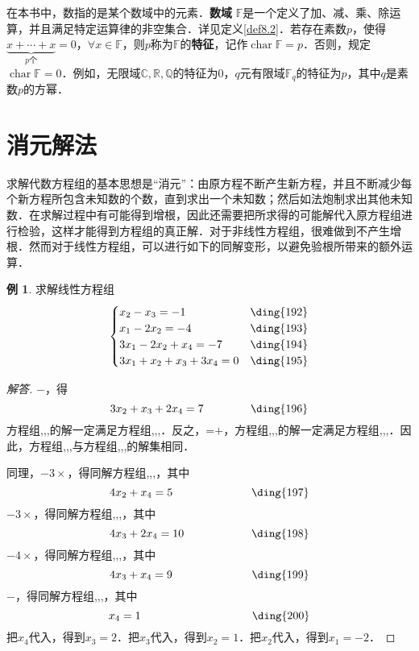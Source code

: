\documentclass[a4paper,fontset=windows]{ctexbook}
\theoremstyle{definition}
\newtheorem{example}{例}[chapter]
\DeclareMathOperator{\Char}{char}
\begin{document}
\medskip 在本书中，数指的是某个数域中的元素．{\bf 数域} $\mathbb{F}$是一个定义了加、减、乘、除运算，并且满足特定运算律的非空集合．详见定义\ref{def8.2}．若存在素数$p$，使得$\underbrace{x+\cdots+x}_{p\text{个}}=0$，$\forall x\in\mathbb{F}$，则$p$称为$\mathbb{F}$的{\bf 特征}，记作$\Char\mathbb{F}=p$．否则，规定$\Char\mathbb{F}=0$．例如，无限域$\mathbb{C},\mathbb{R},\mathbb{Q}$的特征为0，$q$元有限域$\mathbb{F}_q$的特征为$p$，其中$q$是素数$p$的方幂．

\section{消元解法}

求解代数方程组的基本思想是“消元”：由原方程不断产生新方程，并且不断减少每个新方程所包含未知数的个数，直到求出一个未知数；然后如法炮制求出其他未知数．在求解过程中有可能得到增根，因此还需要把所求得的可能解代入原方程组进行检验，这样才能得到方程组的真正解．对于非线性方程组，很难做到不产生增根．然而对于线性方程组，可以进行如下的同解变形，以避免验根所带来的额外运算．

\begin{example}\label{ex1.1}
求解线性方程组
$$\begin{cases}x_2-x_3=-1&\text{\ding{192}} \\ x_1-2x_2=-4&\text{\ding{193}} \\ 3x_1-2x_2+x_4=-7&\text{\ding{194}} \\ 3x_1+x_2+x_3+3x_4=0&\text{\ding{195}}\end{cases}$$
\end{example}

\begin{proof}[解答]
$-$，得
$$3x_2+x_3+2x_4=7\hspace{42pt}\text{\ding{196}}$$
方程组,,,的解一定满足方程组,,,．反之，=$+$，方程组,,,的解一定满足方程组,,,．因此，方程组,,,与方程组,,,的解集相同．

同理，$-3\times$，得同解方程组,,,，其中
$$4x_2+x_4=5\hspace{70pt}\text{\ding{197}}$$
$-3\times$，得同解方程组,,,，其中
$$4x_3+2x_4=10\hspace{60pt}\text{\ding{198}}$$
$-4\times$，得同解方程组,,,，其中
$$4x_3+x_4=9\hspace{71pt}\text{\ding{199}}$$
$-$，得同解方程组,,,，其中
$$x_4=1\hspace{99pt}\text{\ding{200}}$$
把$x_4$代入，得到$x_3=2$．把$x_3$代入，得到$x_2=1$．把$x_2$代入，得到$x_1=-2$．
\end{proof}
\end{document}
